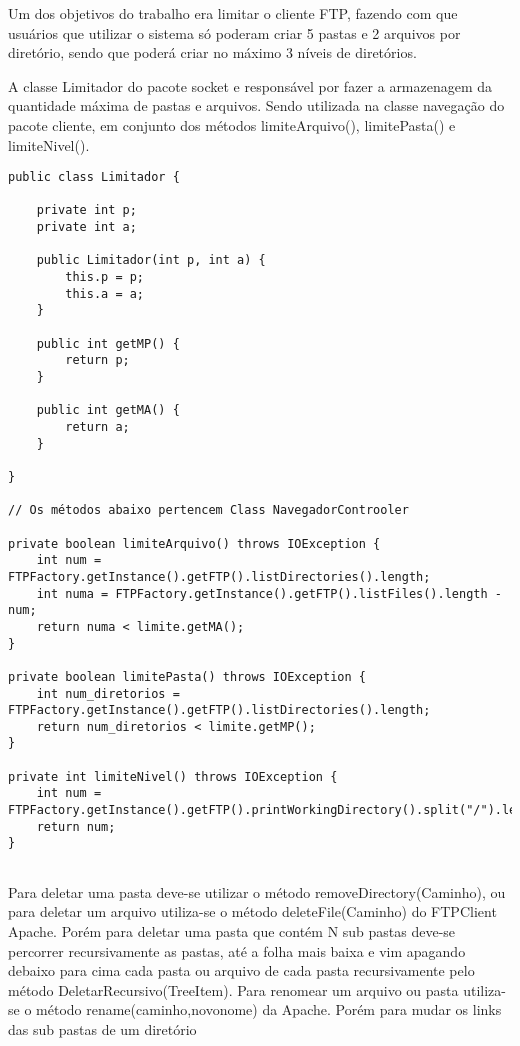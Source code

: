 \documentclass[12pt]{article}
\begin{document}
Um dos objetivos do trabalho era limitar o cliente FTP, fazendo com que usuários que utilizar o sistema só poderam criar 5 pastas e 2 arquivos por diretório, sendo que poderá criar no máximo 3 níveis de diretórios.

A classe Limitador do pacote socket e responsável por fazer a armazenagem da quantidade máxima de pastas e arquivos. Sendo utilizada na classe navegação do pacote cliente, em conjunto dos métodos limiteArquivo(), limitePasta()  e limiteNivel().
 
 \begin{lstlisting}
public class Limitador {

	private int p;
	private int a;
	
	public Limitador(int p, int a) {
		this.p = p;
		this.a = a;
	}
	
	public int getMP() {
		return p;
	}
	
	public int getMA() {
		return a;
	}

}

// Os métodos abaixo pertencem Class NavegadorControoler

private boolean limiteArquivo() throws IOException {
	int num = FTPFactory.getInstance().getFTP().listDirectories().length;
	int numa = FTPFactory.getInstance().getFTP().listFiles().length - num;
	return numa < limite.getMA();
}

private boolean limitePasta() throws IOException {
	int num_diretorios = FTPFactory.getInstance().getFTP().listDirectories().length;
	return num_diretorios < limite.getMP();
}

private int limiteNivel() throws IOException {
	int num = FTPFactory.getInstance().getFTP().printWorkingDirectory().split("/").length;
	return num;
}


\end{lstlisting}
	Para deletar uma pasta deve-se utilizar o método removeDirectory(Caminho), ou para deletar um arquivo utiliza-se o método deleteFile(Caminho) do FTPClient Apache. Porém para deletar uma pasta que contém N sub pastas deve-se percorrer recursivamente as pastas, até a folha mais baixa e vim apagando debaixo para cima cada pasta ou arquivo de cada pasta recursivamente pelo método DeletarRecursivo(TreeItem).
	Para renomear um arquivo ou pasta utiliza-se o método rename(caminho,novonome) da Apache. Porém para mudar os links das sub pastas de um diretório  
\end{document}
